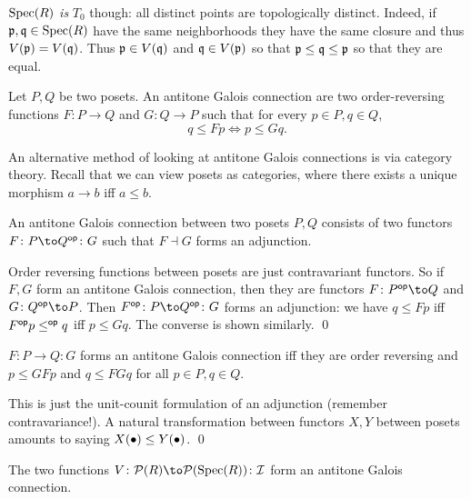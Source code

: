     ${\rm Spec}(R)$ {\it is\/} $T_0$ though: all distinct points are topologically distinct.
    Indeed, if ${{\frak p}},{{\frak q}}\in{\rm Spec}(R)$ have the same neighborhoods they have the same closure and thus $V({{\frak p}})=V({{\frak q}})$.
    Thus ${{\frak p}}\in V({{\frak q}})$ and ${{\frak q}}\in V({{\frak p}})$ so that ${{\frak p}}\leq{{\frak q}}\leq{{\frak p}}$ so that they are equal.

\eexam

\bdefn

    Let $P,Q$ be two posets.
    An {\emphcolor antitone Galois connection} are two order-reversing functions $F\colon P\to Q$ and $G\colon Q\to P$ such that for every $p\in P,q\in Q$,
    $$ q \leq Fp \iff p \leq Gq . $$

\edefn

An alternative method of looking at antitone Galois connections is via category theory.
Recall that we can view posets as categories, where there exists a unique morphism $a\to b$ iff $a\leq b$.

\bprop

    An antitone Galois connection between two posets $P,Q$ consists of two functors $F\colon P\to Q^\op\colon G$ such that $F\dashv G$ forms an adjunction.

\eprop

\bproof

    Order reversing functions between posets are just contravariant functors.
    So if $F,G$ form an antitone Galois connection, then they are functors $F\colon P^\op\to Q$ and $G\colon Q^\op\to P$.
    Then $F^\op\colon P\to Q^\op\colon G$ forms an adjunction: we have $q\leq Fp$ iff $F^{\sf op} p\leq^{\sf op} q$ iff $p\leq Gq$.
    The converse is shown similarly.
    \qed

\eproof

\bcoro

    $F\colon P\to Q\colon G$ forms an antitone Galois connection iff they are order reversing and $p\leq GFp$ and $q\leq FGq$ for all $p\in P,q\in Q$.

\ecoro

\bproof

    This is just the unit-counit formulation of an adjunction (remember contravariance!).
    A natural transformation between functors $X,Y$ between posets amounts to saying $X(\bullet)\leq Y(\bullet)$.
    \qed

\eproof

\bcoro

    The two functions $V\colon\pow(R)\to\pow(\spec(R))\colon\ideal$ form an antitone Galois connection.


